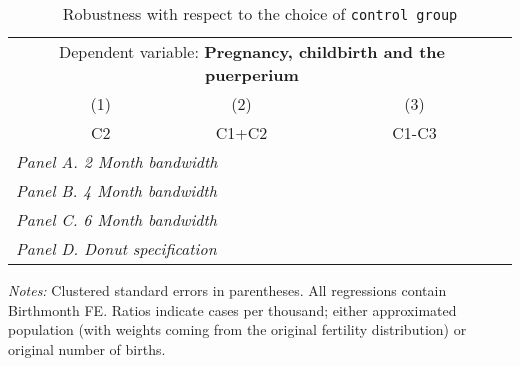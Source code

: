  \begin{table}[H] \begin{threeparttable} \centering \caption{Robustness with respect to the choice of \texttt{control group}} {\def\sym#1{\ifmmode^{#1}\else\(^{#1}\)\fi} \begin{tabular}{l*{4}{c}} \toprule \multicolumn{4}{c}{Dependent variable: \textbf{Pregnancy, childbirth and the puerperium}} \\ \cmidrule(lr){2-4}
            &\multicolumn{1}{c}{(1)}&\multicolumn{1}{c}{(2)}&\multicolumn{1}{c}{(3)}\\
            &\multicolumn{1}{c}{C2}&\multicolumn{1}{c}{C1+C2}&\multicolumn{1}{c}{C1-C3}\\
\midrule
 \multicolumn{4}{l}{\emph{Panel A. 2 Month bandwidth}} \\    \midrule\multicolumn{4}{l}{\emph{Panel B. 4 Month bandwidth}} \\    \midrule\multicolumn{4}{l}{\emph{Panel C. 6 Month bandwidth}} \\    \midrule\multicolumn{4}{l}{\emph{Panel D. Donut specification}} \\    
\bottomrule \end{tabular} } \begin{tablenotes} \item \scriptsize \emph{Notes:} Clustered standard errors in parentheses. All regressions contain Birthmonth FE. Ratios indicate cases per thousand; either approximated population (with weights coming from the original fertility distribution) or original number of births. \end{tablenotes} \end{threeparttable} \end{table} 
